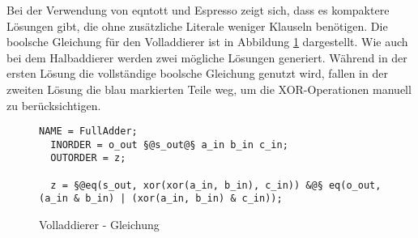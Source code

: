 Bei der Verwendung von eqntott und Espresso zeigt sich, dass es kompaktere Lösungen gibt, die ohne zusätzliche Literale weniger Klauseln benötigen.
Die boolsche Gleichung für den Volladdierer ist in Abbildung \ref{fig:fulladder_qen} dargestellt. Wie auch bei dem Halbaddierer werden zwei mögliche
Lösungen generiert. Während in der ersten Lösung die vollständige boolsche Gleichung genutzt wird, fallen in der zweiten Lösung die blau markierten
Teile weg, um die XOR-Operationen manuell zu berücksichtigen. \clearpage
\begin{figure}[!h]
  \centering
  \begin{lstlisting}[]
  NAME = FullAdder;
  INORDER = o_out §@s_out@§ a_in b_in c_in;
  OUTORDER = z;

  z = §@eq(s_out, xor(xor(a_in, b_in), c_in)) &@§ eq(o_out, (a_in & b_in) | (xor(a_in, b_in) & c_in));
  \end{lstlisting}
  \caption{Volladdierer - Gleichung}
  \label{fig:fulladder_qen}
\end{figure}

